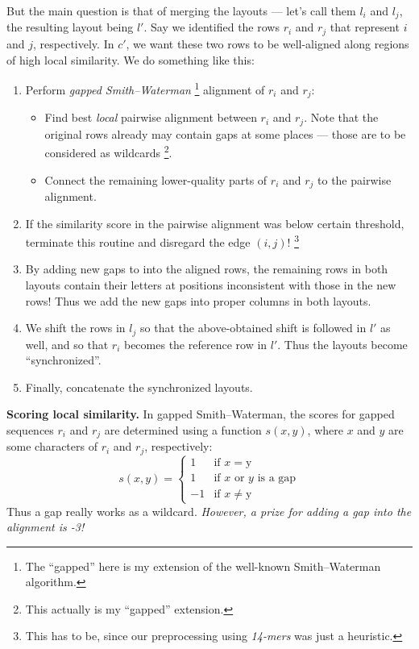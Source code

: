 \documentclass[11pt, oneside]{article}
\begin{document}
But the main question is that of merging the layouts --- let's call them $l_i$ and $l_j$, the
resulting layout being $l'$. Say we identified the rows $r_i$ and $r_j$ that represent
$i$ and $j$, respectively. In $c'$, we want these two rows to be well-aligned along regions
of high local similarity.
We do something like this:
\begin{enumerate}
 \item
 Perform \emph{gapped Smith--Waterman}
 \footnote{The ``gapped'' here is my extension of the well-known Smith--Waterman algorithm.}
 alignment of $r_i$ and $r_j$:
 \begin{itemize}
  \item Find best \emph{local} pairwise alignment between $r_i$ and $r_j$.
        Note that the original rows already may contain gaps at some places ---
	those are to be considered as wildcards
        \footnote{This actually is my ``gapped'' extension.}.
  \item Connect the remaining lower-quality parts of $r_i$ and $r_j$ to the pairwise alignment.  
 \end{itemize}
 \item
 If the similarity score in the pairwise alignment was below certain threshold,
 terminate this routine and disregard the edge $(i,j)$!
 \footnote{This has to be, since our preprocessing using \emph{14-mers} was just a heuristic.}
 \item
 By adding new gaps to into the aligned rows, the remaining rows in both layouts contain their
 letters at positions inconsistent with those in the new rows!
 Thus we add the new gaps into proper columns in both layouts.
 \item
 We shift the rows in $l_j$ so that the above-obtained shift is followed in $l'$ as well, and
 so that $r_i$ becomes the reference row in $l'$.  
 Thus the layouts become ``synchronized''.
 \item Finally, concatenate the synchronized layouts.  
\end{enumerate}

{\bf Scoring local similarity.}
In gapped Smith--Waterman, the scores for gapped sequences $r_i$ and $r_j$ are determined
using a function $s(x,y)$, where $x$ and $y$ are some characters of $r_i$ and $r_j$, respectively: 
$$
s(x,y) = 
  \left\{
     \begin{array}{ll}
     1 & \textrm{if $x = $y}\\
     1 & \textrm{if $x$ or $y$ is a gap} \\
     -1 & \textrm{if $x \neq $y}

     \end{array}
  \right.
$$
Thus a gap really works as a wildcard.
\emph{However, a prize for \emph{adding} a gap into the alignment is -3!}
\end{document}
